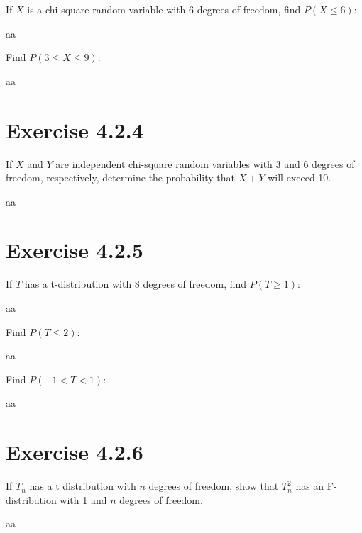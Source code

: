 \documentclass[titlepage, letterpaper, fleqn]{article}
\newcommand{\spacepls}{\vspace{5mm}}
\begin{document}
{\large If $X$ is a chi-square random variable with 6 degrees of freedom, find $P(X \leq 6)$:}

aa

\spacepls

{\large Find $P(3 \leq X \leq 9)$:}

aa

\spacepls

\section{Exercise 4.2.4}

{\large If $X$ and $Y$ are independent chi-square random variables with 3 and 6 degrees of freedom, respectively, determine the probability that $X + Y$ will exceed 10.}

aa

\spacepls

\section{Exercise 4.2.5}

{\large If $T$ has a t-distribution with 8 degrees of freedom, find $P(T \geq 1)$:}

aa

\spacepls

{\large Find $P(T \leq 2)$:}

aa

\spacepls

{\large Find $P(-1 < T < 1)$:}

aa

\spacepls

\section{Exercise 4.2.6}

{\large If $T_n$ has a t distribution with $n$ degrees of freedom, show that $T_n^2$ has an F-distribution with 1 and $n$ degrees of freedom.}

aa
\end{document}
